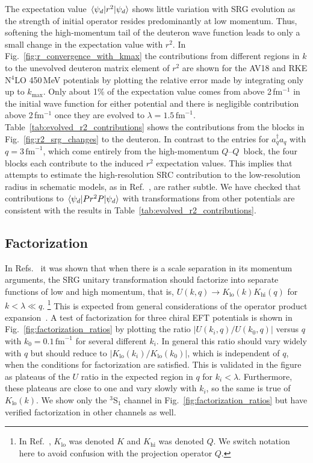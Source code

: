 \documentclass[10pt,aps,prc,floatfix,twocolumn,nofootinbib]{revtex4-1}
\newcommand{\ataq}{a^{\dagger}_q a_q}
\newcommand{\Klo}{K_{\text{lo}}}
\newcommand{\Khi}{K_{\text{hi}}}
\newcommand{\QQ}{\ensuremath{Q\mbox{--}Q}}
\begin{document}
The expectation value $\mel{\psi_d}{r^2}{\psi_d}$ shows little variation with SRG evolution as the strength of initial operator resides predominantly at low momentum.
Thus, softening the high-momentum tail of the deuteron wave function leads to only a small change in the expectation value with $r^2$.
In Fig.~\ref{fig:r_convergence_with_kmax} the contributions from different regions in $k$ to the unevolved deuteron matrix element of $r^2$ are shown for the AV18 and RKE N$^4$LO 450\,MeV potentials by plotting the relative error made by integrating only up to $k_{\text{max}}$.
Only about 1\% of the expectation value comes from above 2\,fm$^{-1}$ in the initial wave function for either potential and there is negligible contribution above 2\,fm$^{-1}$ once they are evolved to $\lambda=1.5\,\mbox{fm}^{-1}$.
Table~\ref{tab:evolved_r2_contributions} shows the contributions from the blocks in Fig.~\ref{fig:r2_srg_changes} to the deuteron.
In contrast to the entries for $\ataq$ with $q = 3\,\mbox{fm}^{-1}$, which come entirely from the high-momentum \QQ\ block, the four blocks each contribute to the induced $r^2$ expectation values.
This implies that attempts to estimate the high-resolution SRC contribution to the low-resolution radius in schematic models, as in Ref.~\cite{Miller:2018mfb}, are rather subtle.
We have checked that contributions to $\mel{\psi_d}{P r^2P }{\psi_d}$ with transformations from other potentials are consistent with the results in Table~\ref{tab:evolved_r2_contributions}.


\subsection{Factorization}
\label{subsec:factorization}


In Refs.~\cite{Bogner:2007jb,Anderson:2010aq} it was shown that when there is a scale separation in its momentum arguments, the SRG unitary transformation should factorize into separate functions of low and high momentum, that is, $U(k,q) \rightarrow \Klo(k)\Khi(q)$ for $k < \lambda \ll q$.%
\footnote{In Ref.~\cite{Anderson:2010aq}, $\Klo$ was denoted $K$ and $\Khi$ was denoted $Q$. We switch notation here to avoid confusion with the projection operator $Q$.}
This is expected from general considerations of the operator product expansion~\cite{Anderson:2010aq,Bogner:2012zm}.
A test of factorization for three chiral EFT potentials is shown in Fig.~\ref{fig:factorization_ratios} by plotting the ratio $|U(k_i,q)/U(k_0,q)|$ versus $q$ with $k_0=0.1\,\mbox{fm}^{-1}$ for several different $k_i$. 
In general this ratio should vary widely with $q$ but should reduce to $|\Klo(k_i)/\Klo(k_0)|$, which is independent of $q$, when the conditions for factorization are satisfied.
This is validated in the figure as plateaus of the $U$ ratio in the expected region in $q$ for $k_i < \lambda$.
Furthermore, these plateaus are close to one and vary slowly with $k_i$, so the same is true of $\Klo(k)$.
We show only the $^3$S$_1$ channel in Fig.~\ref{fig:factorization_ratios} but have verified factorization in other channels as well.
\end{document}
